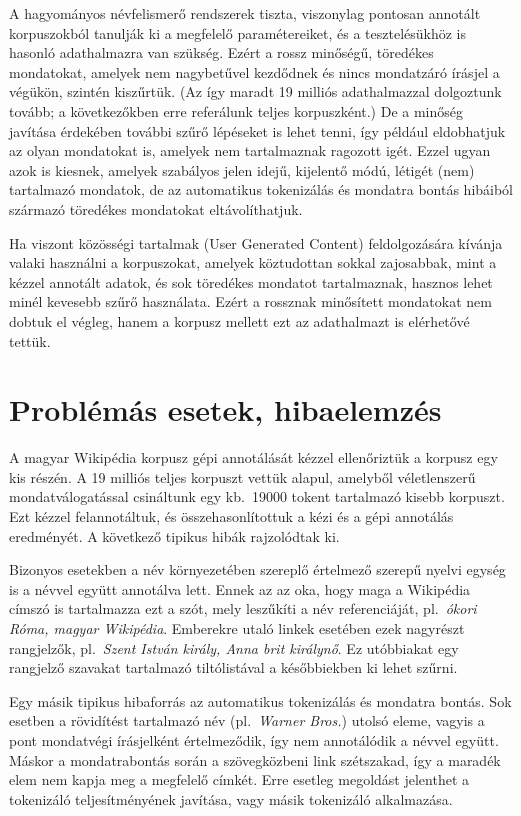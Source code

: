 \documentclass{llncs}
\begin{document}
A hagyományos névfelismerő rendszerek tiszta, viszonylag pontosan annotált korpuszokból tanulják ki a megfelelő paramétereiket, és a tesztelésükhöz is hasonló adathalmazra van szükség. Ezért a rossz minőségű, töredékes mondatokat, amelyek nem nagybetűvel kezdődnek és nincs mondatzáró írásjel a végükön, szintén kiszűrtük. (Az így maradt 19 milliós adathalmazzal dolgoztunk tovább; a következőkben erre referálunk teljes korpuszként.) De a minőség javítása érdekében további szűrő lépéseket is lehet tenni, így például eldobhatjuk az olyan mondatokat is, amelyek nem tartalmaznak ragozott igét. Ezzel ugyan azok is kiesnek, amelyek szabályos jelen idejű, kijelentő módú, létigét (nem) tartalmazó mondatok, de az automatikus tokenizálás és mondatra bontás hibáiból származó töredékes mondatokat eltávolíthatjuk.  

Ha viszont közösségi tartalmak (User Generated Content) feldolgozására kívánja valaki használni a korpuszokat, amelyek köztudottan sokkal zajosabbak, mint a kézzel annotált adatok, és sok töredékes mondatot tartalmaznak, hasznos lehet minél kevesebb szűrő használata. Ezért a rossznak minősített mondatokat nem dobtuk el végleg, hanem a korpusz mellett ezt az adathalmazt is elérhetővé tettük.

\section{Problémás esetek, hibaelemzés}
\label{probl}

A magyar Wikipédia korpusz gépi annotálását kézzel ellenőriztük a korpusz egy kis részén. A 19 milliós teljes korpuszt vettük alapul, amelyből véletlenszerű mondatválogatással csináltunk egy kb.~19000 tokent tartalmazó kisebb korpuszt. Ezt kézzel felannotáltuk, és összehasonlítottuk a kézi és a gépi annotálás eredményét. A következő tipikus hibák rajzolódtak ki. 

Bizonyos esetekben a név környezetében szereplő értelmező szerepű nyelvi egység is a névvel együtt annotálva lett. Ennek az az oka, hogy maga a Wikipédia címszó is tartalmazza ezt a szót, mely leszűkíti a név referenciáját, pl.~\textit{ókori Róma, magyar Wikipédia}. Emberekre utaló linkek esetében ezek nagyrészt rangjelzők, pl.~\textit{Szent István király, Anna brit királynő}. Ez utóbbiakat egy rangjelző szavakat tartalmazó tiltólistával a későbbiekben ki lehet szűrni. 

Egy másik tipikus hibaforrás az automatikus tokenizálás és mondatra bontás. Sok esetben a rövidítést tartalmazó név (pl.~\textit{Warner Bros.}) utolsó eleme, vagyis a pont mondatvégi írásjelként értelmeződik, így nem annotálódik a névvel együtt. Máskor a mondatrabontás során a szövegközbeni link szétszakad, így a maradék elem nem kapja meg a megfelelő címkét. Erre esetleg megoldást jelenthet a tokenizáló teljesítményének javítása, vagy másik tokenizáló alkalmazása.  
\end{document}
